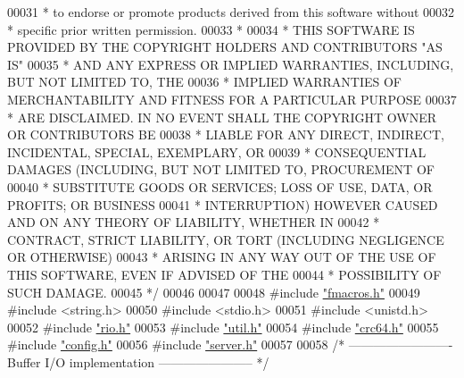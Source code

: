 \begin{DoxyCode}
00031 \textcolor{comment}{ *     to endorse or promote products derived from this software without}
00032 \textcolor{comment}{ *     specific prior written permission.}
00033 \textcolor{comment}{ *}
00034 \textcolor{comment}{ * THIS SOFTWARE IS PROVIDED BY THE COPYRIGHT HOLDERS AND CONTRIBUTORS "AS IS"}
00035 \textcolor{comment}{ * AND ANY EXPRESS OR IMPLIED WARRANTIES, INCLUDING, BUT NOT LIMITED TO, THE}
00036 \textcolor{comment}{ * IMPLIED WARRANTIES OF MERCHANTABILITY AND FITNESS FOR A PARTICULAR PURPOSE}
00037 \textcolor{comment}{ * ARE DISCLAIMED. IN NO EVENT SHALL THE COPYRIGHT OWNER OR CONTRIBUTORS BE}
00038 \textcolor{comment}{ * LIABLE FOR ANY DIRECT, INDIRECT, INCIDENTAL, SPECIAL, EXEMPLARY, OR}
00039 \textcolor{comment}{ * CONSEQUENTIAL DAMAGES (INCLUDING, BUT NOT LIMITED TO, PROCUREMENT OF}
00040 \textcolor{comment}{ * SUBSTITUTE GOODS OR SERVICES; LOSS OF USE, DATA, OR PROFITS; OR BUSINESS}
00041 \textcolor{comment}{ * INTERRUPTION) HOWEVER CAUSED AND ON ANY THEORY OF LIABILITY, WHETHER IN}
00042 \textcolor{comment}{ * CONTRACT, STRICT LIABILITY, OR TORT (INCLUDING NEGLIGENCE OR OTHERWISE)}
00043 \textcolor{comment}{ * ARISING IN ANY WAY OUT OF THE USE OF THIS SOFTWARE, EVEN IF ADVISED OF THE}
00044 \textcolor{comment}{ * POSSIBILITY OF SUCH DAMAGE.}
00045 \textcolor{comment}{ */}
00046 
00047 
00048 \textcolor{preprocessor}{#}\textcolor{preprocessor}{include} \hyperlink{fmacros_8h}{"fmacros.h"}
00049 \textcolor{preprocessor}{#}\textcolor{preprocessor}{include} \textcolor{preprocessor}{<}\textcolor{preprocessor}{string}\textcolor{preprocessor}{.}\textcolor{preprocessor}{h}\textcolor{preprocessor}{>}
00050 \textcolor{preprocessor}{#}\textcolor{preprocessor}{include} \textcolor{preprocessor}{<}\textcolor{preprocessor}{stdio}\textcolor{preprocessor}{.}\textcolor{preprocessor}{h}\textcolor{preprocessor}{>}
00051 \textcolor{preprocessor}{#}\textcolor{preprocessor}{include} \textcolor{preprocessor}{<}\textcolor{preprocessor}{unistd}\textcolor{preprocessor}{.}\textcolor{preprocessor}{h}\textcolor{preprocessor}{>}
00052 \textcolor{preprocessor}{#}\textcolor{preprocessor}{include} \hyperlink{rio_8h}{"rio.h"}
00053 \textcolor{preprocessor}{#}\textcolor{preprocessor}{include} \hyperlink{util_8h}{"util.h"}
00054 \textcolor{preprocessor}{#}\textcolor{preprocessor}{include} \hyperlink{crc64_8h}{"crc64.h"}
00055 \textcolor{preprocessor}{#}\textcolor{preprocessor}{include} \hyperlink{config_8h}{"config.h"}
00056 \textcolor{preprocessor}{#}\textcolor{preprocessor}{include} \hyperlink{server_8h}{"server.h"}
00057 
00058 \textcolor{comment}{/* ------------------------- Buffer I/O implementation ----------------------- */}

\end{DoxyCode}
